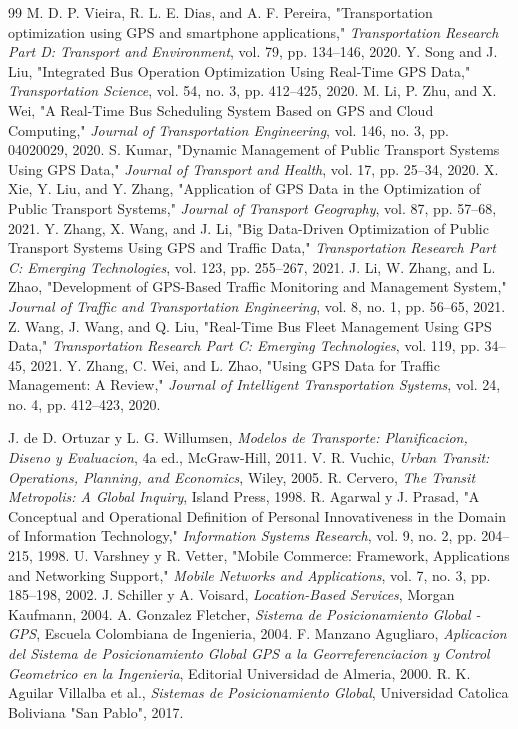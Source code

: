 \begin{thebibliography}{99}
 M. D. P. Vieira, R. L. E. Dias, and A. F. Pereira, "Transportation optimization using GPS and smartphone applications," \textit{Transportation Research Part D: Transport and Environment}, vol. 79, pp. 134--146, 2020.
 Y. Song and J. Liu, "Integrated Bus Operation Optimization Using Real-Time GPS Data," \textit{Transportation Science}, vol. 54, no. 3, pp. 412--425, 2020.
 M. Li, P. Zhu, and X. Wei, "A Real-Time Bus Scheduling System Based on GPS and Cloud Computing," \textit{Journal of Transportation Engineering}, vol. 146, no. 3, pp. 04020029, 2020.
 S. Kumar, "Dynamic Management of Public Transport Systems Using GPS Data," \textit{Journal of Transport and Health}, vol. 17, pp. 25--34, 2020.
 X. Xie, Y. Liu, and Y. Zhang, "Application of GPS Data in the Optimization of Public Transport Systems," \textit{Journal of Transport Geography}, vol. 87, pp. 57--68, 2021.
 Y. Zhang, X. Wang, and J. Li, "Big Data-Driven Optimization of Public Transport Systems Using GPS and Traffic Data," \textit{Transportation Research Part C: Emerging Technologies}, vol. 123, pp. 255--267, 2021.
 J. Li, W. Zhang, and L. Zhao, "Development of GPS-Based Traffic Monitoring and Management System," \textit{Journal of Traffic and Transportation Engineering}, vol. 8, no. 1, pp. 56--65, 2021.
 Z. Wang, J. Wang, and Q. Liu, "Real-Time Bus Fleet Management Using GPS Data," \textit{Transportation Research Part C: Emerging Technologies}, vol. 119, pp. 34--45, 2021.
 Y. Zhang, C. Wei, and L. Zhao, "Using GPS Data for Traffic Management: A Review," \textit{Journal of Intelligent Transportation Systems}, vol. 24, no. 4, pp. 412--423, 2020.

 J. de D. Ortuzar y L. G. Willumsen, \textit{Modelos de Transporte: Planificacion, Diseno y Evaluacion}, 4a ed., McGraw-Hill, 2011.
 V. R. Vuchic, \textit{Urban Transit: Operations, Planning, and Economics}, Wiley, 2005.
 R. Cervero, \textit{The Transit Metropolis: A Global Inquiry}, Island Press, 1998.
 R. Agarwal y J. Prasad, "A Conceptual and Operational Definition of Personal Innovativeness in the Domain of Information Technology," \textit{Information Systems Research}, vol. 9, no. 2, pp. 204--215, 1998.
 U. Varshney y R. Vetter, "Mobile Commerce: Framework, Applications and Networking Support," \textit{Mobile Networks and Applications}, vol. 7, no. 3, pp. 185--198, 2002.
 J. Schiller y A. Voisard, \textit{Location-Based Services}, Morgan Kaufmann, 2004.
 A. Gonzalez Fletcher, \textit{Sistema de Posicionamiento Global - GPS}, Escuela Colombiana de Ingenieria, 2004.
 F. Manzano Agugliaro, \textit{Aplicacion del Sistema de Posicionamiento Global GPS a la Georreferenciacion y Control Geometrico en la Ingenieria}, Editorial Universidad de Almeria, 2000.
 R. K. Aguilar Villalba et al., \textit{Sistemas de Posicionamiento Global}, Universidad Catolica Boliviana "San Pablo", 2017.


\end{thebibliography}
